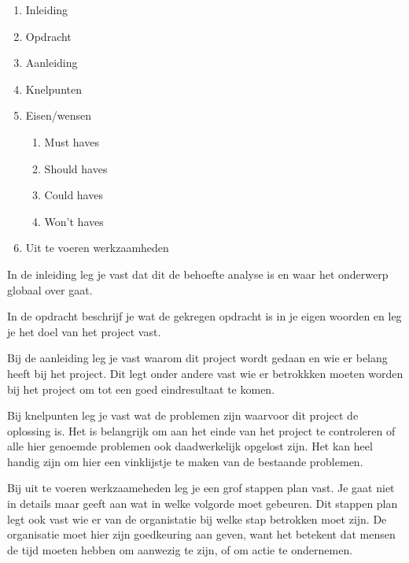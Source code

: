 \begin{enumerate}
\item Inleiding
\item Opdracht
\item Aanleiding
\item Knelpunten
\item Eisen/wensen
	\begin{enumerate}
	\item Must haves
	\item Should haves
	\item Could haves
	\item Won't haves
	\end{enumerate}
\item Uit te voeren werkzaamheden
\end{enumerate}

In de inleiding leg je vast dat dit de behoefte analyse is en waar het onderwerp globaal over gaat.

In de opdracht beschrijf je wat de gekregen opdracht is in je eigen woorden en leg je het doel van het project vast.

Bij de aanleiding leg je vast waarom dit project wordt gedaan en wie er belang heeft bij het project. Dit legt onder andere vast wie er betrokkken moeten worden bij het project om tot een goed eindresultaat te komen.

Bij knelpunten leg je vast wat de problemen zijn waarvoor dit project de oplossing is. Het is belangrijk om aan het einde van het project te controleren of alle hier genoemde problemen ook daadwerkelijk opgelost zijn. Het kan heel handig zijn om hier een vinklijstje te maken van de bestaande problemen.

Bij uit te voeren werkzaameheden leg je een grof stappen plan vast. Je gaat niet in details maar geeft aan wat in welke volgorde moet gebeuren. Dit stappen plan legt ook vast wie er van de organistatie bij welke stap betrokken moet zijn. De organisatie moet hier zijn goedkeuring aan geven, want het betekent dat mensen de tijd moeten hebben om aanwezig te zijn, of om actie te ondernemen.
